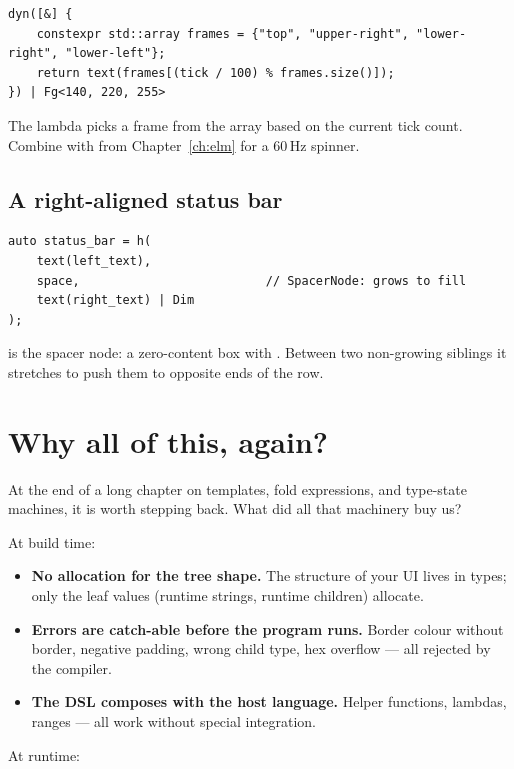\begin{lstlisting}
dyn([&] {
    constexpr std::array frames = {"top", "upper-right", "lower-right", "lower-left"};
    return text(frames[(tick / 100) % frames.size()]);
}) | Fg<140, 220, 255>
\end{lstlisting}

The lambda picks a frame from the array based on the current tick
count. Combine with 
from Chapter~\ref{ch:elm} for a 60\,Hz spinner.

\subsection{A right-aligned status bar}

\begin{lstlisting}
auto status_bar = h(
    text(left_text),
    space,                          // SpacerNode: grows to fill
    text(right_text) | Dim
);
\end{lstlisting}

 is the spacer node: a zero-content box with
. Between two non-growing siblings it stretches to
push them to opposite ends of the row.

\section{Why all of this, again?}
\label{sec:dsl:why-again}

At the end of a long chapter on templates, fold expressions, and
type-state machines, it is worth stepping back. What did all that
machinery buy us?

At build time:

\begin{itemize}[leftmargin=*]
  \item \textbf{No allocation for the tree shape.} The structure of
    your UI lives in types; only the leaf values (runtime strings,
    runtime children) allocate.
  \item \textbf{Errors are catch-able before the program runs.}
    Border colour without border, negative padding, wrong child
    type, hex overflow --- all rejected by the compiler.
  \item \textbf{The DSL composes with the host language.} Helper
    functions, lambdas, ranges --- all work without special
    integration.
\end{itemize}

At runtime:

